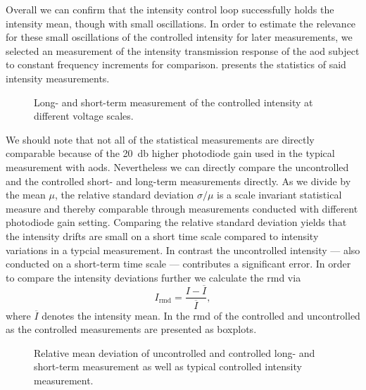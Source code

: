 Overall we can confirm that the intensity control loop successfully holds the
intensity mean, though with small oscillations. In order to estimate the
relevance for these small oscillations of the controlled intensity for later
measurements, we selected an measurement of the intensity transmission
response of the \gls{aod} subject to constant frequency increments for
comparison.  presents the statistics of
said intensity measurements.
\begin{figure}[htb]
  \centering
  \begin{adjustbox}{width=\textwidth}
    
  \end{adjustbox}
  \caption{Long- and short-term measurement of the controlled intensity at
    different voltage scales.
  }\label{fig:intensity_control}
\end{figure}
We should note that not all of the statistical measurements are directly
comparable because of the \SI{20}{\decibel} higher photodiode gain used in
the typical measurement with \gls{aod}s. Nevertheless we can directly compare
the uncontrolled and the controlled short- and long-term measurements
directly. As we divide by the mean $\mu$, the relative standard deviation
$\sigma/\mu$ is a scale invariant statistical measure and thereby comparable
through measurements conducted with different photodiode gain setting.
Comparing the relative standard deviation yields that the intensity drifts
are small on a short time scale compared to intensity variations in a typcial
measurement. In contrast the uncontrolled intensity --- also conducted on
a short-term time scale --- contributes a significant error. In order to
compare the intensity deviations further we calculate the \gls{rmd} via
\begin{equation}
  I_\text{rmd}
  =
  \frac{I-\overline{I}}{\overline{I}}
  \label{eq:relative_mean_deviation},
\end{equation}
where $\overline{I}$ denotes the intensity mean. In
 the \gls{rmd} of the controlled and
uncontrolled as the controlled measurements are presented as boxplots.
\begin{figure}[htb]
  \centering
  \begin{adjustbox}{width=\textwidth}
    
  \end{adjustbox}
  \caption{Relative mean deviation of uncontrolled and controlled long- and
    short-term measurement as well as typical controlled intensity measurement.
  }\label{fig:intensity_control_rmd}
\end{figure}
